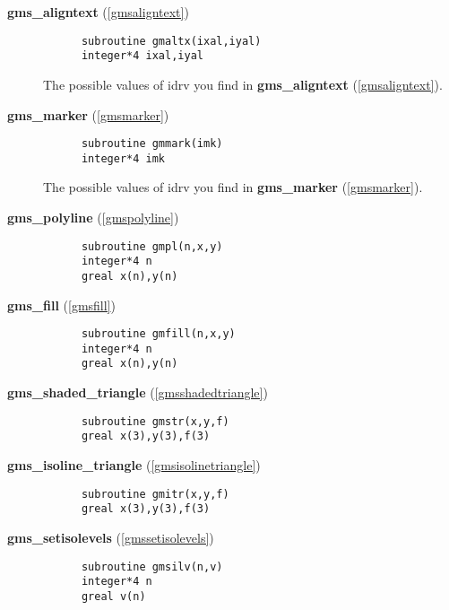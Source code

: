 \begin{description}
\item[
{\bf gms\_aligntext} (\ref{gmsaligntext})]\mbox{}


\begin{verbatim}
      subroutine gmaltx(ixal,iyal)
      integer*4 ixal,iyal
\end{verbatim}

The possible values of idrv you find in 
{\bf gms\_aligntext} (\ref{gmsaligntext}).

\item[
{\bf gms\_marker} (\ref{gmsmarker})]\mbox{}


\begin{verbatim}
      subroutine gmmark(imk)
      integer*4 imk
\end{verbatim}

The possible values of idrv you find in 
{\bf gms\_marker} (\ref{gmsmarker}).

\item[
{\bf gms\_polyline} (\ref{gmspolyline})]\mbox{}


\begin{verbatim}
      subroutine gmpl(n,x,y)
      integer*4 n
      greal x(n),y(n)
\end{verbatim}


\item[
{\bf gms\_fill} (\ref{gmsfill})]\mbox{}


\begin{verbatim}
      subroutine gmfill(n,x,y)
      integer*4 n
      greal x(n),y(n)
\end{verbatim}



\item[
{\bf gms\_shaded\_triangle} (\ref{gmsshadedtriangle})]\mbox{}


\begin{verbatim}
      subroutine gmstr(x,y,f)
      greal x(3),y(3),f(3)
\end{verbatim}



\item[
{\bf gms\_isoline\_triangle} (\ref{gmsisolinetriangle})]\mbox{}


\begin{verbatim}
      subroutine gmitr(x,y,f)
      greal x(3),y(3),f(3)
\end{verbatim}


\item[
{\bf gms\_setisolevels} (\ref{gmssetisolevels})]\mbox{}


\begin{verbatim}
      subroutine gmsilv(n,v)
      integer*4 n
      greal v(n)
\end{verbatim}




\end{description}
